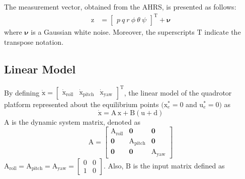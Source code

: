 \documentclass[3p]{elsarticle}
\begin{document}
The measurement vector, obtained from the AHRS, is presented as follows:
\begin{equation}
    \begin{split}
        \boldsymbol{\mathrm{z}} &= \begin{bmatrix}
        p \
        q \
        r \
        \phi \
        \theta \
        \psi
    \end{bmatrix}^\mathrm{T} + \boldsymbol{\nu}
    \end{split}
\end{equation}
where $\boldsymbol{\nu}$ is a Gaussian white noise. Moreover, the superscripts $\mathrm{T}$ indicate the transpose notation.
\subsection{Linear Model}
\noindent By defining $\boldsymbol{\dot{\mathrm{x}}} = \begin{bmatrix}
	\boldsymbol{{\mathrm{\dot x_{\text{roll}}}}}&
	\boldsymbol{{\mathrm{\dot x_{\text{pitch}}}}}&
	\boldsymbol{{\mathrm{\dot x_{\text{yaw}}}}}
\end{bmatrix}^{\mathrm{T}}$, the linear model of the quadrotor platform represented about the equilibrium points $(\boldsymbol{{\mathrm{x}}}_e^*\!=\!0$ and $\boldsymbol{{\mathrm{u}}}_e^*\!=\!0)$ as
\begin{equation}\label{eq:linear}
	\boldsymbol{\dot{\mathrm{x}}} = \boldsymbol{\mathrm{A\,x}} + 
	\boldsymbol{\mathrm{B}}
	\left(\boldsymbol{\mathrm{u}} + \boldsymbol{\mathrm{d}}\right)
\end{equation}
$\boldsymbol{\mathrm{A}}$ is the dynamic system matrix, denoted as
\begin{equation}
	\boldsymbol{\mathrm{A}} = \begin{bmatrix}
		\boldsymbol{{\mathrm{A_{\text{roll}}}}} & \boldsymbol{0} & \boldsymbol{0}\\
		\boldsymbol{0} & \boldsymbol{{\mathrm{A_{\text{pitch}}}}} & \boldsymbol{0} \\
		\boldsymbol{0} & \boldsymbol{0} & \boldsymbol{{\mathrm{A_{\text{yaw}}}}}
	\end{bmatrix}
\end{equation}
$
		\boldsymbol{\mathrm{A}}_{\text{roll}}  =\boldsymbol{\mathrm{A}}_{\text{pitch}}  = \boldsymbol{\mathrm{A}}_{\text{yaw}}  = \begin{bmatrix}
			0 & 0\\
			1 & 0
		\end{bmatrix}
$. Also, $\boldsymbol{\mathrm{B}}$ is the input matrix defined as
\end{document}
